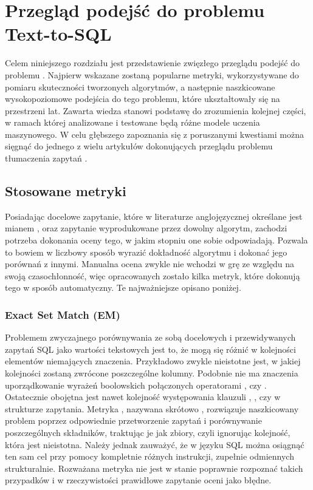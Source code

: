 \chapter{Przegląd podejść do problemu Text-to-SQL}
Celem niniejszego rozdziału jest przedstawienie zwięzłego przeglądu podejść do problemu . Najpierw wskazane zostaną popularne metryki, wykorzystywane do pomiaru skuteczności tworzonych algorytmów, a następnie naszkicowane wysokopoziomowe podejścia do tego problemu, które ukształtowały się na przestrzeni lat. Zawarta wiedza stanowi podstawę do zrozumienia kolejnej części, w ramach której analizowane i testowane będą różne modele uczenia maszynowego. W celu głębszego zapoznania się z poruszanymi kwestiami można sięgnąć do jednego z wielu artykułów dokonujących przeglądu problemu tłumaczenia zapytań .

\section{Stosowane metryki}
\label{section:metrics}
Posiadając docelowe zapytanie, które w literaturze anglojęzycznej określane jest mianem , oraz zapytanie wyprodukowane przez dowolny algorytm, zachodzi potrzeba dokonania oceny tego, w jakim stopniu one sobie odpowiadają. Pozwala to bowiem w liczbowy sposób wyrazić dokładność algorytmu i dokonać jego porównań z innymi. Manualna ocena zwykle nie wchodzi w grę ze względu na swoją czasochłonność, więc opracowanych zostało kilka metryk, które dokonują tego w sposób automatyczny. Te najważniejsze opisano poniżej.

\subsection{Exact Set Match (EM)}
Problemem zwyczajnego porównywania ze sobą docelowych i przewidywanych zapytań SQL jako wartości tekstowych jest to, że mogą się różnić w kolejności elementów niemających znaczenia. Przykładowo zwykle nieistotne jest, w jakiej kolejności zostaną zwrócone poszczególne kolumny. Podobnie nie ma znaczenia uporządkowanie wyrażeń boolowskich połączonych operatorami , czy . Ostatecznie obojętna jest nawet kolejność występowania klauzuli , , czy  w strukturze zapytania. Metryka , nazywana skrótowo , rozwiązuje naszkicowany problem poprzez odpowiednie przetworzenie zapytań i porównywanie poszczególnych składników, traktując je jak zbiory, czyli ignorując kolejność, która jest nieistotna. Należy jednak zauważyć, że w języku SQL można osiągnąć ten sam cel przy pomocy kompletnie różnych instrukcji, zupełnie odmiennych strukturalnie. Rozważana metryka nie jest w stanie poprawnie rozpoznać takich przypadków i w rzeczywistości prawidłowe zapytanie oceni jako błędne.

